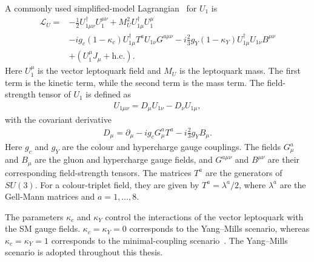 A commonly used simplified-model Lagrangian~\cite{Cornella2019} for $U_{1}$ is
\begin{align}
    \mathcal{L}_{U}
    =
    &
    -\frac{1}{2}
    U_{1\mu\nu}^{\dagger}
    U_{1}^{\mu\nu}
    +
    M_{U}^{2}
    U_{1\mu}^{\dagger}
    U_{1}^{\mu}
    \nonumber\\
    &
    -ig_{c}(1-\kappa_{c})
    U_{1\mu}^{\dagger}
    T^{a}
    U_{1\nu}
    G^{a\mu\nu}
    -
    i\frac{2}{3}g_{Y}(1-\kappa_{Y})
    U_{1\mu}^{\dagger}
    U_{1\nu}
    B^{\mu\nu}
    \nonumber\\
    &
    +
    \left(
        U_{1}^{\mu}J_{\mu}
        +
        \mathrm{h.c.}
    \right).
    \label{eq:u1_full_lagrangian}
\end{align}
Here $U_{1}^{\mu}$ is the vector leptoquark field and $M_{U}$ is the leptoquark mass. 
The first term is the kinetic term, while the second term is the mass term. 
The field-strength tensor of $U_{1}$ is defined as
\begin{align}
    U_{1\mu\nu}
    =
    D_{\mu}U_{1\nu}
    -
    D_{\nu}U_{1\mu},
    \label{eq:u1_field_strength}
\end{align}
with the covariant derivative
\begin{align}
    D_{\mu}
    =
    \partial_{\mu}
    -
    ig_{c}G_{\mu}^{a}T^{a}
    -
    i\frac{2}{3}g_{Y}B_{\mu}.
    \label{eq:u1_covariant_derivative}
\end{align}
Here $g_{c}$ and $g_{Y}$ are the colour and hypercharge gauge couplings. 
The fields $G_{\mu}^{a}$ and $B_{\mu}$ are the gluon and hypercharge gauge fields, and $G^{a\mu\nu}$ and $B^{\mu\nu}$ are their corresponding field-strength tensors. 
The matrices $T^{a}$ are the generators of $SU(3)$. 
For a colour-triplet field, they are given by $T^{a}=\lambda^{a}/2$, where $\lambda^{a}$ are the Gell-Mann matrices and $a=1,\ldots,8$.

The parameters $\kappa_{c}$ and $\kappa_{Y}$ control the interactions
of the vector leptoquark with the SM gauge fields.
$\kappa_{c}=\kappa_{Y}=0$ corresponds to the Yang--Mills scenario,
whereas $\kappa_{c}=\kappa_{Y}=1$ corresponds to the minimal-coupling
scenario~\cite{Cornella2019,Baker2019HighPTU1}.
The Yang--Mills scenario is adopted throughout this thesis.

